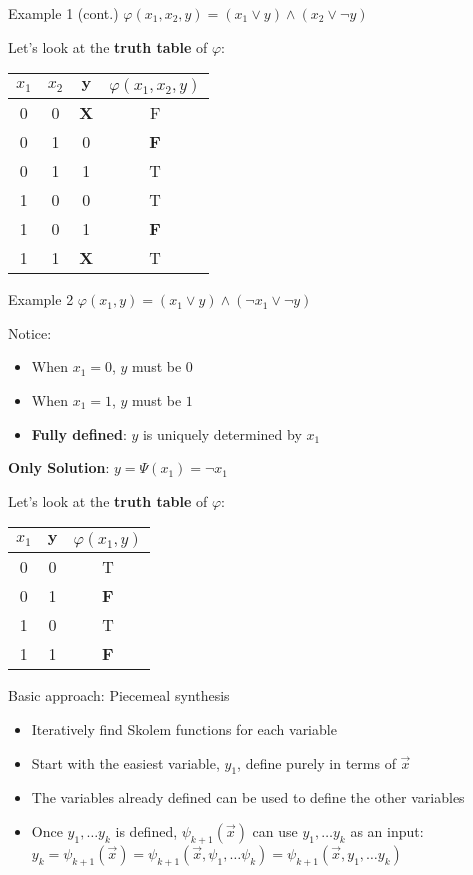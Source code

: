 \documentclass[aspectratio=169]{beamer}
\begin{document}
\begin{frame}{Example 1 (cont.)}
$\varphi(x_1, x_2, y) = (x_1 \lor y) \land (x_2 \lor \neg y)$
\bigskip

Let's look at the \textbf{truth table} of \(\varphi\):

\begin{tabular}{|c|c|c|c|}
    \hline
    $x_1$ & $x_2$ & $\mathbf{y}$ & $\varphi(x_1, x_2, y)$ \\
    \hline
    0 & 0 & \textbf{X} & F\\
    0 & 1 & 0 & \textbf{F}\\
    0 & 1 & 1 & T\\
    1 & 0 & 0 & T\\
    1 & 0 & 1 & \textbf{F}\\
    1 & 1 & \textbf{X} & T\\
    \hline
\end{tabular}
\end{frame}

\begin{frame}{Example 2}
$\varphi(x_1, y) = (x_1 \lor y) \land (\neg x_1 \lor \neg y)$
\bigskip

Notice:
\begin{itemize}
    \item When $x_1 = 0$, $y$ must be $0$
    \item When $x_1 = 1$, $y$ must be $1$
    \item \textbf{Fully defined}: $y$ is uniquely determined by $x_1$
\end{itemize}
\bigskip

\textbf{Only Solution}: $y = \Psi(x_1) = \neg x_1$
\bigskip

Let's look at the \textbf{truth table} of \(\varphi\):
\begin{tabular}{|c|c|c|}
    \hline
    $x_1$ & $\mathbf{y}$ & $\varphi(x_1, y)$ \\
    \hline
    0 & 0 & T\\
    0 & 1 & \textbf{F}\\
    1 & 0 & T\\
    1 & 1 & \textbf{F}\\
    \hline
\end{tabular}
\end{frame}

\begin{frame}{Basic approach: Piecemeal synthesis}
\begin{itemize}
    \item Iteratively find Skolem functions for each variable
    \item Start with the easiest variable, $y_1$, define purely in terms of $\vec{x}$
    \item The variables already defined can be used to define the other variables
    \item Once $y_1, \ldots y_k$ is defined, $\psi_{k+1}(\vec{x})$ can use $y_1,\ldots y_k$ as an input:
        $y_k=\psi_{k+1}(\vec{x}) =
        \psi_{k+1}(\vec{x}, \psi_1, \ldots \psi_k) =
        \psi_{k+1}(\vec{x}, y_1, \ldots y_k)$
\end{itemize}
\bigskip

\end{frame}
\end{document}
